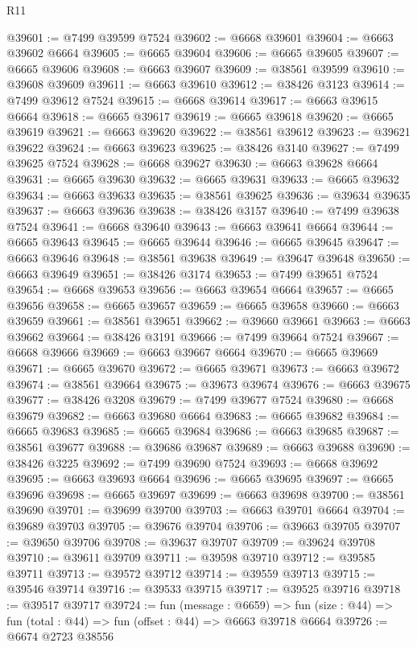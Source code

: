 \begin{lexlean}{R11}
\begin{coremodule}
@39601 := @7499 @39599 @7524
@39602 := @6668 @39601
@39604 := @6663 @39602 @6664
@39605 := @6665 @39604
@39606 := @6665 @39605
@39607 := @6665 @39606
@39608 := @6663 @39607
@39609 := @38561 @39599
@39610 := @39608 @39609
@39611 := @6663 @39610
@39612 := @38426 @3123
@39614 := @7499 @39612 @7524
@39615 := @6668 @39614
@39617 := @6663 @39615 @6664
@39618 := @6665 @39617
@39619 := @6665 @39618
@39620 := @6665 @39619
@39621 := @6663 @39620
@39622 := @38561 @39612
@39623 := @39621 @39622
@39624 := @6663 @39623
@39625 := @38426 @3140
@39627 := @7499 @39625 @7524
@39628 := @6668 @39627
@39630 := @6663 @39628 @6664
@39631 := @6665 @39630
@39632 := @6665 @39631
@39633 := @6665 @39632
@39634 := @6663 @39633
@39635 := @38561 @39625
@39636 := @39634 @39635
@39637 := @6663 @39636
@39638 := @38426 @3157
@39640 := @7499 @39638 @7524
@39641 := @6668 @39640
@39643 := @6663 @39641 @6664
@39644 := @6665 @39643
@39645 := @6665 @39644
@39646 := @6665 @39645
@39647 := @6663 @39646
@39648 := @38561 @39638
@39649 := @39647 @39648
@39650 := @6663 @39649
@39651 := @38426 @3174
@39653 := @7499 @39651 @7524
@39654 := @6668 @39653
@39656 := @6663 @39654 @6664
@39657 := @6665 @39656
@39658 := @6665 @39657
@39659 := @6665 @39658
@39660 := @6663 @39659
@39661 := @38561 @39651
@39662 := @39660 @39661
@39663 := @6663 @39662
@39664 := @38426 @3191
@39666 := @7499 @39664 @7524
@39667 := @6668 @39666
@39669 := @6663 @39667 @6664
@39670 := @6665 @39669
@39671 := @6665 @39670
@39672 := @6665 @39671
@39673 := @6663 @39672
@39674 := @38561 @39664
@39675 := @39673 @39674
@39676 := @6663 @39675
@39677 := @38426 @3208
@39679 := @7499 @39677 @7524
@39680 := @6668 @39679
@39682 := @6663 @39680 @6664
@39683 := @6665 @39682
@39684 := @6665 @39683
@39685 := @6665 @39684
@39686 := @6663 @39685
@39687 := @38561 @39677
@39688 := @39686 @39687
@39689 := @6663 @39688
@39690 := @38426 @3225
@39692 := @7499 @39690 @7524
@39693 := @6668 @39692
@39695 := @6663 @39693 @6664
@39696 := @6665 @39695
@39697 := @6665 @39696
@39698 := @6665 @39697
@39699 := @6663 @39698
@39700 := @38561 @39690
@39701 := @39699 @39700
@39703 := @6663 @39701 @6664
@39704 := @39689 @39703
@39705 := @39676 @39704
@39706 := @39663 @39705
@39707 := @39650 @39706
@39708 := @39637 @39707
@39709 := @39624 @39708
@39710 := @39611 @39709
@39711 := @39598 @39710
@39712 := @39585 @39711
@39713 := @39572 @39712
@39714 := @39559 @39713
@39715 := @39546 @39714
@39716 := @39533 @39715
@39717 := @39525 @39716
@39718 := @39517 @39717
@39724 := fun (message : @6659) =>
  fun (size : @44) => fun (total : @44) => fun (offset : @44) => @6663 @39718 @6664
@39726 := @6674 @2723 @38556

\end{coremodule}
\end{lexlean}
